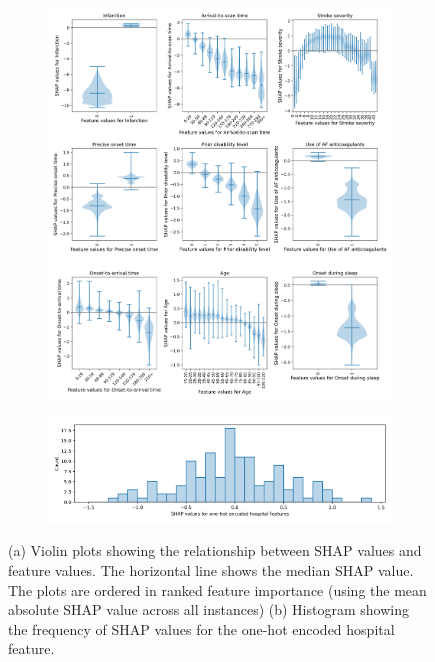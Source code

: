 \begin{figure}%
\centering
\begin{subfigure}{.9\textwidth}
  \centering
    \includegraphics[width=1.\textwidth]{./images/03d_xgb_10_features_thrombolysis_shap_violin_all_features}
    \caption{}
  \label{fig:shap_feature_subfigure_a}
\end{subfigure}
\begin{subfigure}{.9\textwidth}
  \centering
    \includegraphics[width=1.\textwidth]{./images/03d_xgb_10_features_hosp_shap_hist}
    \caption{}
  \label{fig:shap_feature_subfigure_b}
\end{subfigure}
\caption{(a) Violin plots showing the relationship between SHAP values and feature values. The horizontal line shows the median SHAP value. The plots are ordered in ranked feature importance (using the mean absolute SHAP value across all instances) (b) Histogram showing the frequency of SHAP values for the one-hot encoded hospital feature.}
\label{fig:shap_feature_subfigure}
\end{figure}

